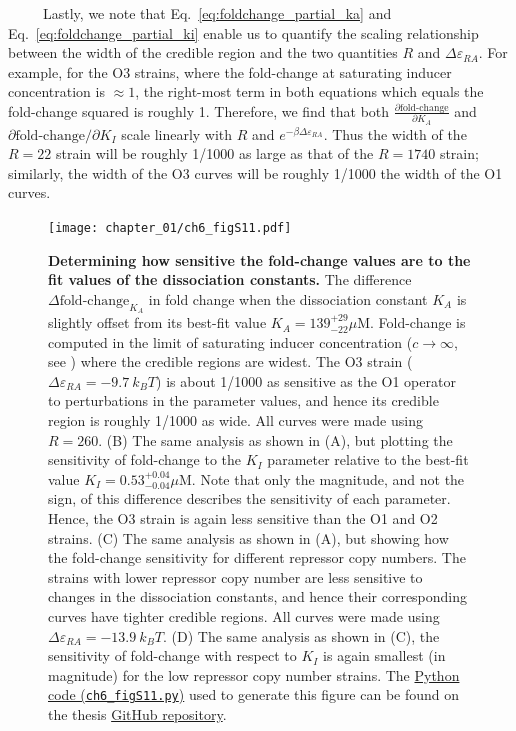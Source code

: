 \documentclass[12pt]{caltech_thesis}
\begin{document}
~~~~~Lastly, we note that Eq.~\ref{eq:foldchange_partial_ka} and
Eq.~\ref{eq:foldchange_partial_ki} enable us to quantify the scaling
relationship between the width of the credible region and the two
quantities \(R\) and \(\Delta\varepsilon_{RA}\). For example, for the O3
strains, where the fold-change at saturating inducer concentration is
\(\approx 1\), the right-most term in both equations which equals the
fold-change squared is roughly 1. Therefore, we find that both
\(\frac{\partial  \text{fold-change}}{\partial K_A}\) and
\(\partial \text{fold-change}/\partial K_I\) scale linearly with \(R\)
and \(e^{-\beta \Delta\varepsilon_{RA}}\). Thus the width of the
\(R=22\) strain will be roughly 1/1000 as large as that of the
\(R=1740\) strain; similarly, the width of the O3 curves will be roughly
1/1000 the width of the O1 curves.

\hypertarget{fig:kaki_sensitivity}{%
\begin{figure}
\centering
\texttt{[image: chapter\_01/ch6\_figS11.pdf]}
\caption[{Sensitivity analysis of the fold-change function to \(K_A\)
and \(K_I\) estimates.}]{\textbf{Determining how sensitive the
fold-change values are to the fit values of the dissociation constants.}
The difference \(\Delta \text{fold-change}_{K_A}\) in fold change when
the dissociation constant \(K_A\) is slightly offset from its best-fit
value \(K_A=139^{+29}_{-22} \mu\text{M}\). Fold-change is computed in
the limit of saturating inducer concentration (\(c \rightarrow \infty\),
see ) where the credible regions are widest. The O3 strain
(\(\Delta\varepsilon_{RA} = -9.7~k_B T\)) is about 1/1000 as sensitive
as the O1 operator to perturbations in the parameter values, and hence
its credible region is roughly 1/1000 as wide. All curves were made
using \(R = 260\). (B) The same analysis as shown in (A), but plotting
the sensitivity of fold-change to the \(K_I\) parameter relative to the
best-fit value \(K_I=0.53^{+0.04}_{-0.04} \mu\text{M}\). Note that only
the magnitude, and not the sign, of this difference describes the
sensitivity of each parameter. Hence, the O3 strain is again less
sensitive than the O1 and O2 strains. (C) The same analysis as shown in
(A), but showing how the fold-change sensitivity for different repressor
copy numbers. The strains with lower repressor copy number are less
sensitive to changes in the dissociation constants, and hence their
corresponding curves have tighter credible regions. All curves were made
using \(\Delta\varepsilon_{RA} = -13.9~k_B T\). (D) The same analysis as
shown in (C), the sensitivity of fold-change with respect to \(K_I\) is
again smallest (in magnitude) for the low repressor copy number strains.
The
\href{https://github.com/gchure/phd/blob/master/src/chapter_06/code/ch6_figS11.py}{Python
code (\texttt{ch6\_figS11.py})} used to generate this figure can be
found on the thesis \href{https://github.com/gchure/phd}{GitHub
repository}.}
\label{fig:kaki_sensitivity}
\end{figure}
}
\end{document}
